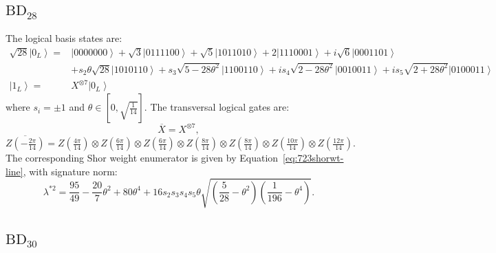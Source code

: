 \documentclass[8pt]{article}
\theoremstyle{definition}
\begin{document}
\subsection{\texorpdfstring{$\mathrm{BD}_{28}$}{BD₂₈}}

The logical basis states are:
\begin{align*}
    \sqrt{28}\left|0_{L}\right\rangle = & \left|0000000\right\rangle +\sqrt{3}\left|0111100\right\rangle +\sqrt{5}\left|1011010\right\rangle +2\left|1110001\right\rangle +i\sqrt{6}\left|0001101\right\rangle                                                \\
                                        & +s_{2}\theta\sqrt{28}\left|1010110\right\rangle +s_{3}\sqrt{5-28\theta^{2}}\left|1100110\right\rangle +is_{4}\sqrt{2-28\theta^{2}}\left|0010011\right\rangle +is_{5}\sqrt{2+28\theta^{2}}\left|0100011\right\rangle \\
    \left|1_{L}\right\rangle =          & X^{\otimes7}\left|0_{L}\right\rangle
\end{align*}
where $s_i=\pm 1$ and $\theta\in \left[0,\sqrt{\frac{1}{14}}\right]$. The transversal logical gates are:
\[ \overline{X}=X^{\otimes7}, \]
\[ \overline{Z\left(-\tfrac{2\pi}{14}\right)}=Z\left(\tfrac{4\pi}{14}\right)\otimes Z\left(\tfrac{6\pi}{14}\right)\otimes Z\left(\tfrac{6\pi}{14}\right)\otimes Z\left(\tfrac{8\pi}{14}\right)\otimes Z\left(\tfrac{8\pi}{14}\right)\otimes Z\left(\tfrac{10\pi}{14}\right)\otimes Z\left(\tfrac{12\pi}{14}\right). \]
The corresponding Shor weight enumerator is given by Equation~\eqref{eq:723shorwt-line}, with signature norm:
\[ \lambda^{*2}=\frac{95}{49}-\frac{20}{7}\theta^{2}+80\theta^{4}+16s_{2}s_{3}s_{4}s_{5}\theta\sqrt{\left(\frac{5}{28}-\theta^{2}\right)\left(\frac{1}{196}-\theta^{4}\right)}. \]

\subsection{\texorpdfstring{$\mathrm{BD}_{30}$}{BD₃₀}}
\end{document}
